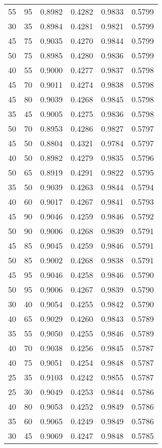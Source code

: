 \begin{center}
\begin{longtable}{|l|l|l|l|l|l|}
55 & 95 & 0.8982 & 0.4282 & 0.9833 & 0.5799 \\
30 & 35 & 0.8984 & 0.4281 & 0.9821 & 0.5799 \\
45 & 75 & 0.9035 & 0.4270 & 0.9844 & 0.5799 \\
50 & 75 & 0.8985 & 0.4280 & 0.9836 & 0.5799 \\
40 & 55 & 0.9000 & 0.4277 & 0.9837 & 0.5798 \\
45 & 70 & 0.9011 & 0.4274 & 0.9838 & 0.5798 \\
45 & 80 & 0.9039 & 0.4268 & 0.9845 & 0.5798 \\
35 & 45 & 0.9005 & 0.4275 & 0.9836 & 0.5798 \\
50 & 70 & 0.8953 & 0.4286 & 0.9827 & 0.5797 \\
45 & 50 & 0.8804 & 0.4321 & 0.9784 & 0.5797 \\
40 & 50 & 0.8982 & 0.4279 & 0.9835 & 0.5796 \\
50 & 65 & 0.8919 & 0.4291 & 0.9822 & 0.5795 \\
35 & 50 & 0.9039 & 0.4263 & 0.9844 & 0.5794 \\
40 & 60 & 0.9017 & 0.4267 & 0.9841 & 0.5793 \\
45 & 90 & 0.9046 & 0.4259 & 0.9846 & 0.5792 \\
50 & 90 & 0.9006 & 0.4268 & 0.9839 & 0.5791 \\
45 & 85 & 0.9045 & 0.4259 & 0.9846 & 0.5791 \\
50 & 85 & 0.9002 & 0.4268 & 0.9838 & 0.5791 \\
45 & 95 & 0.9046 & 0.4258 & 0.9846 & 0.5790 \\
50 & 95 & 0.9006 & 0.4267 & 0.9839 & 0.5790 \\
30 & 40 & 0.9054 & 0.4255 & 0.9842 & 0.5790 \\
40 & 65 & 0.9029 & 0.4260 & 0.9843 & 0.5789 \\
35 & 55 & 0.9050 & 0.4255 & 0.9846 & 0.5789 \\
40 & 70 & 0.9038 & 0.4256 & 0.9845 & 0.5787 \\
40 & 75 & 0.9051 & 0.4254 & 0.9848 & 0.5787 \\
25 & 35 & 0.9103 & 0.4242 & 0.9855 & 0.5787 \\
25 & 30 & 0.9049 & 0.4253 & 0.9844 & 0.5786 \\
40 & 80 & 0.9053 & 0.4252 & 0.9849 & 0.5786 \\
35 & 60 & 0.9065 & 0.4249 & 0.9849 & 0.5786 \\
30 & 45 & 0.9069 & 0.4247 & 0.9848 & 0.5785 \\

\end{longtable}
\end{center}
